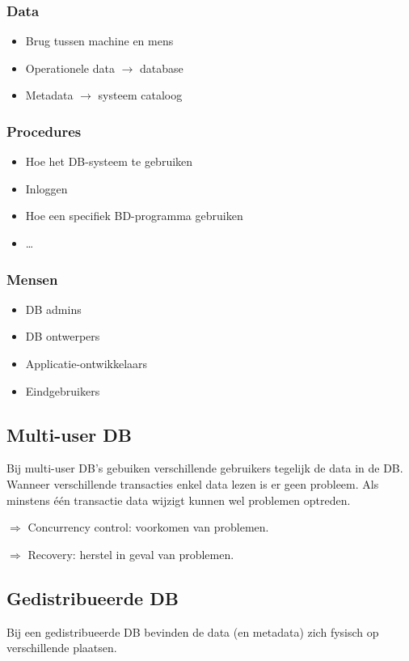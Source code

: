 \documentclass[a4paper,12pt]{article}
\begin{document}
\subsubsection{Data}
\begin{itemize}
\item Brug tussen machine en mens
\item Operationele data $\rightarrow$ database
\item Metadata $\rightarrow$ systeem cataloog
\end{itemize}

\subsubsection{Procedures}
\begin{itemize}
\item Hoe het DB-systeem te gebruiken
\item Inloggen
\item Hoe een specifiek BD-programma gebruiken
\item \dots
\end{itemize}

\subsubsection{Mensen}
\begin{itemize}
\item DB admins
\item DB ontwerpers
\item Applicatie-ontwikkelaars
\item Eindgebruikers
\end{itemize}

\subsection{Multi-user DB}
Bij multi-user DB's gebuiken verschillende gebruikers tegelijk de data in de DB.
Wanneer verschillende transacties enkel data lezen is er geen probleem.
Als minstens één transactie data wijzigt kunnen wel problemen optreden.

$\Rightarrow$ Concurrency control: voorkomen van problemen.

$\Rightarrow$ Recovery: herstel in geval van problemen.

\subsection{Gedistribueerde DB}
Bij een gedistribueerde DB bevinden de data (en metadata) zich fysisch op  verschillende plaatsen.
\end{document}
